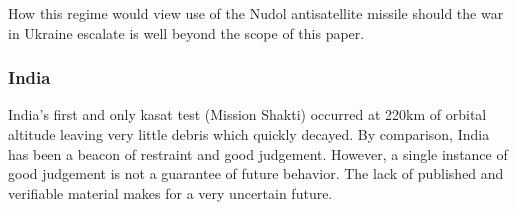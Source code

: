 How this regime would view use of the Nudol antisatellite missile
should the war in Ukraine escalate is well beyond the scope of this
paper.

\subsubsection{India}
India's first and only \ac{kasat} test (Mission Shakti) occurred at
220km of orbital altitude leaving very little debris which quickly
decayed.\cite[p05-01]{brian} By comparison, India has been a beacon of
restraint and good judgement.  However, a single instance of good
judgement is not a guarantee of future behavior.  The lack of
published and verifiable material makes for a very uncertain future.

